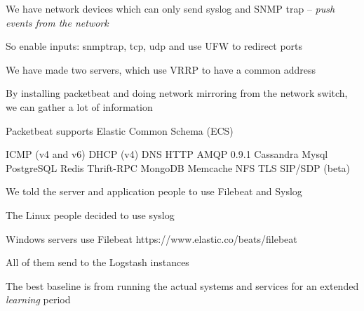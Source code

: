 \documentclass[Screen16to9,17pt]{foils}
\begin{document}

\begin{list2}
\item We have network devices which can only send syslog and SNMP trap -- \emph{push events from the network}
\item So enable inputs: snmptrap, tcp, udp and use UFW to redirect ports
\item We have made two servers, which use VRRP to have a common address
\end{list2}




\begin{list2}
\item By installing packetbeat and doing network mirroring from the network switch, we can gather a lot of information
\item Packetbeat supports Elastic Common Schema (ECS) 
\item ICMP (v4 and v6)
DHCP (v4)
DNS
HTTP
AMQP 0.9.1
Cassandra
Mysql
PostgreSQL
Redis
Thrift-RPC
MongoDB
Memcache
NFS
TLS
SIP/SDP (beta)
\end{list2}




\begin{quote}

\end{quote}

\begin{list2}
\item We told the server and application people to use Filebeat and Syslog
\item The Linux people decided to use syslog
\item Windows servers use Filebeat \link{}https://www.elastic.co/beats/filebeat
\item All of them send to the Logstash instances
\end{list2}




\begin{list2}
\item The best baseline is from running the actual systems and services for an extended \emph{learning} period
\end{list2}
\end{document}
